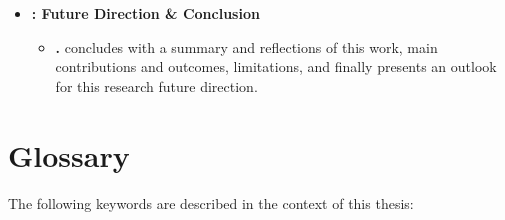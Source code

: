 \begin{itemize}
\begin{itemize}[label={},leftmargin=*]
\end{itemize}

\item \textbf{: Future Direction \& Conclusion}
\begin{itemize}[label={},leftmargin=*]
\item \textbf{.} concludes with a summary and reflections of this work, main contributions and outcomes, limitations, and finally presents an outlook for this research future direction. %

\end{itemize}
\end{itemize}

\pagebreak
\section{Glossary}

The following keywords are described in the context of this thesis:

